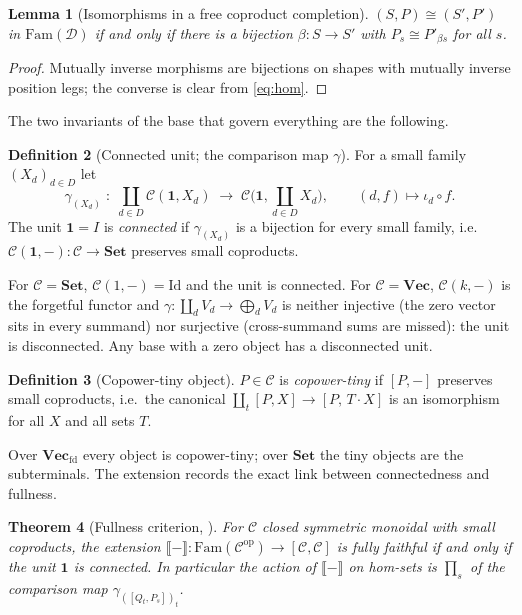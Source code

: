 \documentclass[11pt]{amsart}
\theoremstyle{plain}
\newtheorem{theorem}{Theorem}[section]
\newtheorem{lemma}[theorem]{Lemma}
\theoremstyle{definition}
\newtheorem{definition}[theorem]{Definition}
\newcommand{\C}{\mathcal{C}}
\newcommand{\D}{\mathcal{D}}
\newcommand{\Fam}{\mathrm{Fam}}
\newcommand{\ext}[1]{\llbracket #1 \rrbracket}
\newcommand{\Setb}{\mathbf{Set}}
\newcommand{\Vecb}{\mathbf{Vec}}
\newcommand{\Vecfd}{\mathbf{Vec}_{\mathrm{fd}}}
\newcommand{\op}{\mathrm{op}}
\newcommand{\one}{\mathbf{1}}
\begin{document}
\begin{lemma}[Isomorphisms in a free coproduct completion]\label{lem:iso}
$(S,P)\cong(S',P')$ in $\Fam(\D)$ if and only if there is a bijection $\beta:S\to S'$ with
$P_s\cong P'_{\beta s}$ for all $s$.
\end{lemma}
\begin{proof}
Mutually inverse morphisms are bijections on shapes with mutually inverse position legs; the converse
is clear from \eqref{eq:hom}.
\end{proof}

The two invariants of the base that govern everything are the following.

\begin{definition}[Connected unit; the comparison map $\gamma$]\label{def:connected}
For a small family $(X_d)_{d\in D}$ let
\[
   \gamma_{(X_d)}\;:\;\coprod_{d\in D}\C(\one,X_d)\;\longrightarrow\;\C\!\Big(\one,\coprod_{d\in D}X_d\Big),
   \qquad (d,f)\mapsto\iota_d\circ f .
\]
The unit $\one=I$ is \emph{connected} if $\gamma_{(X_d)}$ is a bijection for every small family, i.e.\
$\C(\one,-):\C\to\Setb$ preserves small coproducts.
\end{definition}

For $\C=\Setb$, $\C(1,-)=\mathrm{Id}$ and the unit is connected. For $\C=\Vecb$, $\C(k,-)$ is the
forgetful functor and $\gamma:\coprod_d V_d\to\bigoplus_d V_d$ is neither injective (the zero vector
sits in every summand) nor surjective (cross-summand sums are missed): the unit is disconnected. Any
base with a zero object has a disconnected unit.

\begin{definition}[Copower-tiny object]\label{def:tiny}
$P\in\C$ is \emph{copower-tiny} if $[P,-]$ preserves small coproducts, i.e.\ the canonical
$\coprod_t[P,X]\to[P,\,T\cdot X]$ is an isomorphism for all $X$ and all sets $T$.
\end{definition}

Over $\Vecfd$ every object is copower-tiny; over $\Setb$ the tiny objects are the subterminals.
The extension records the exact link between connectedness and fullness.

\begin{theorem}[{Fullness criterion, \cite[Thm.~2.1]{proofT1}}]\label{thm:T1}
For $\C$ closed symmetric monoidal with small coproducts, the extension
$\ext{-}:\Fam(\C^{\op})\to[\C,\C]$ is fully faithful if and only if the unit $\one$ is connected. In
particular the action of $\ext{-}$ on hom-sets is $\prod_s$ of the comparison map
$\gamma_{([Q_t,P_s])_t}$.
\end{theorem}
\end{document}

